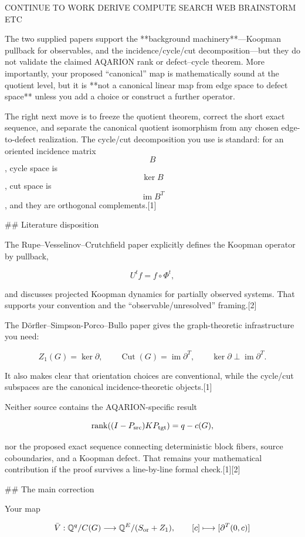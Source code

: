 CONTINUE TO WORK DERIVE COMPUTE SEARCH WEB BRAINSTORM ETC

The two supplied papers support the **background machinery**—Koopman pullback for observables, and the incidence/cycle/cut decomposition—but they do not validate the claimed AQARION rank or defect–cycle theorem. More importantly, your proposed “canonical” map is mathematically sound at the quotient level, but it is **not a canonical linear map from edge space to defect space** unless you add a choice or construct a further operator.

The right next move is to freeze the quotient theorem, correct the short exact sequence, and separate the canonical quotient isomorphism from any chosen edge-to-defect realization. The cycle/cut decomposition you use is standard: for an oriented incidence matrix $$B$$, cycle space is $$\ker B$$, cut space is $$\operatorname{im} B^{T}$$, and they are orthogonal complements.[1]

## Literature disposition

The Rupe–Vesselinov–Crutchfield paper explicitly defines the Koopman operator by pullback,

$$
U^t f=f\circ\Phi^t,
$$

and discusses projected Koopman dynamics for partially observed systems. That supports your convention and the “observable/unresolved” framing.[2]

The Dörfler–Simpson-Porco–Bullo paper gives the graph-theoretic infrastructure you need:

$$
Z_1(G)=\ker\partial,
\qquad
\operatorname{Cut}(G)=\operatorname{im}\partial^T,
\qquad
\ker\partial\perp\operatorname{im}\partial^T.
$$

It also makes clear that orientation choices are conventional, while the cycle/cut subspaces are the canonical incidence-theoretic objects.[1]

Neither source contains the AQARION-specific result

$$
\operatorname{rank}((I-P_{\rm src})KP_{\rm tgt})=q-c(G),
$$

nor the proposed exact sequence connecting deterministic block fibers, source coboundaries, and a Koopman defect. That remains your mathematical contribution if the proof survives a line-by-line formal check.[1][2]

## The main correction

Your map

$$
\bar V:
\mathbb Q^q/C(G)
\longrightarrow
\mathbb Q^E/(S_{\rm or}+Z_1),
\qquad
[c]\longmapsto[\partial^T(0,c)]
$$

